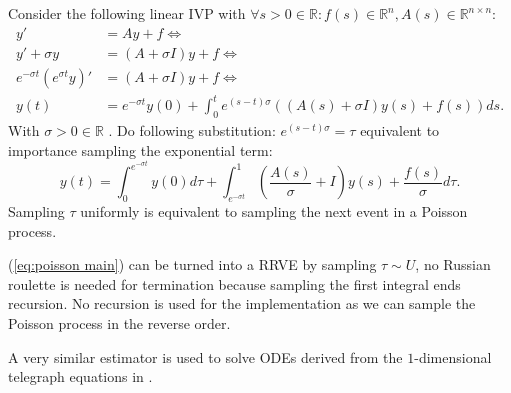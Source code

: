 \documentclass[a4paper,12pt]{article}
\begin{document}
\begin{definition} \label{def:main poisson}
  Consider the following linear IVP with $\forall s>0 \in \mathbb{R}: f(s) \in \mathbb{R}^{n}, A(s) \in \mathbb{R}^{n \times n}$:
  \begin{align}
    y'                              & = A y + f \Leftrightarrow                                                                             \\
    y'+\sigma y                     & = (A + \sigma I) y + f\Leftrightarrow                                                                 \\
    e^{-\sigma t} ( e^{\sigma t}y)' & = (A + \sigma I) y + f  \Leftrightarrow                                                               \\
    y(t)                            & = e^{-\sigma t} y(0) + \int_{0}^{t} e^{(s-t) \sigma} \left(  (A(s) + \sigma I ) y(s) +f(s)\right) ds.
  \end{align}
  With $\sigma>0 \in \mathbb{R}$ . Do following substitution: $e^{(s-t)\sigma} = \tau$ equivalent to importance sampling
  the exponential term:
  \begin{equation} \label{eq:poisson main}
    y(t) = \int_{0}^{e^{-\sigma t}}  y(0) d\tau + \int_{e^{-\sigma t}}^{1} \left(  \frac{A(s)}{\sigma} + I\right)  y(s) + \frac{f(s)}{\sigma} d\tau
    .
  \end{equation}
  Sampling $\tau$ uniformly is equivalent to sampling the next event in a Poisson process.
\end{definition}

\begin{julia} \label{jl:main poisson}
  (\ref{eq:poisson main}) can be turned into a RRVE by sampling $\tau \sim U$, no Russian roulette is needed for
  termination because sampling the first integral ends recursion. No recursion is used
  for the implementation as we can sample the Poisson process in the reverse order.

\end{julia}

\begin{related}
  A very similar estimator is used to solve ODEs derived from the
  $1$-dimensional telegraph equations in \cite{acebron_monte_2016}.
\end{related}
\end{document}
